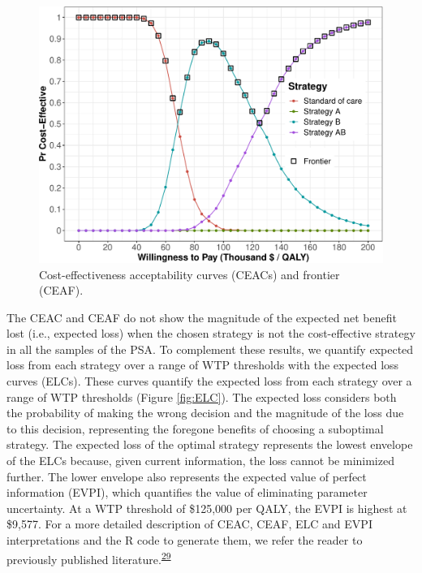 \documentclass[
]{article}
\begin{document}
\begin{figure}[H]

{\centering \includegraphics{figs/CEAC-1} 

}

\caption{Cost-effectiveness acceptability curves (CEACs) and frontier (CEAF).}\label{fig:CEAC}
\end{figure}

The CEAC and CEAF do not show the magnitude of the expected net benefit lost (i.e., expected loss) when the chosen strategy is not the cost-effective strategy in all the samples of the PSA. To complement these results, we quantify expected loss from each strategy over a range of WTP thresholds with the expected loss curves (ELCs). These curves quantify the expected loss from each strategy over a range of WTP thresholds (Figure \ref{fig:ELC}). The expected loss considers both the probability of making the wrong decision and the magnitude of the loss due to this decision, representing the foregone benefits of choosing a suboptimal strategy. The expected loss of the optimal strategy represents the lowest envelope of the ELCs because, given current information, the loss cannot be minimized further. The lower envelope also represents the expected value of perfect information (EVPI), which quantifies the value of eliminating parameter uncertainty. At a WTP threshold of \$125,000 per QALY, the EVPI is highest at \$9,577. For a more detailed description of CEAC, CEAF, ELC and EVPI interpretations and the R code to generate them, we refer the reader to previously published literature.\textsuperscript{\protect\hyperlink{ref-Alarid-Escudero2019}{29}}
\end{document}
